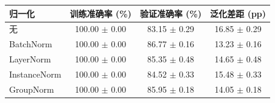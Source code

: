 \begin{tabular}{lccc}
\toprule
归一化 & 训练准确率 (\%) & 验证准确率 (\%) & 泛化差距 (pp) \\
\midrule
无 & 100.00 $\pm$ 0.00 & 83.15 $\pm$ 0.29 & 16.85 $\pm$ 0.29 \\
BatchNorm & 100.00 $\pm$ 0.00 & 86.77 $\pm$ 0.16 & 13.23 $\pm$ 0.16 \\
LayerNorm & 100.00 $\pm$ 0.00 & 85.35 $\pm$ 0.48 & 14.65 $\pm$ 0.48 \\
InstanceNorm & 100.00 $\pm$ 0.00 & 84.52 $\pm$ 0.33 & 15.48 $\pm$ 0.33 \\
GroupNorm & 100.00 $\pm$ 0.00 & 85.95 $\pm$ 0.18 & 14.05 $\pm$ 0.18 \\
\bottomrule
\end{tabular}
